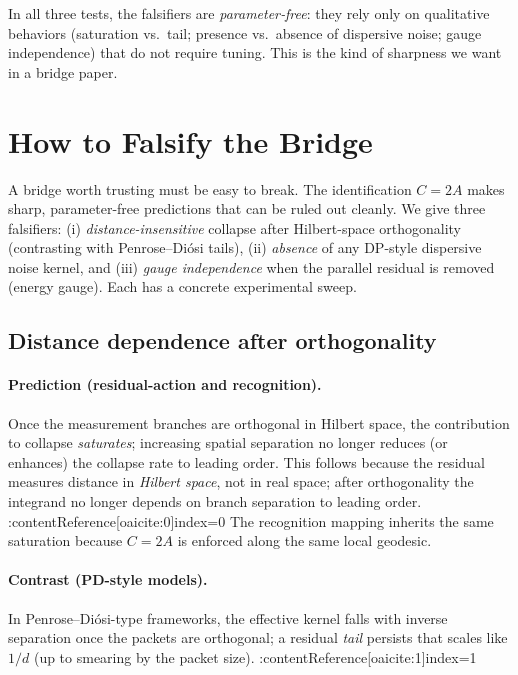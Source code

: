 \documentclass[11pt,letterpaper]{article}
\begin{document}
\medskip
In all three tests, the falsifiers are \emph{parameter‑free}: they rely only on qualitative behaviors (saturation vs.\ tail; presence vs.\ absence of dispersive noise; gauge independence) that do not require tuning. This is the kind of sharpness we want in a bridge paper. %

\section{How to Falsify the Bridge}

A bridge worth trusting must be easy to break. The identification $C=2A$ makes sharp, parameter-free predictions that can be ruled out cleanly. We give three falsifiers: (i) \emph{distance-insensitive} collapse after Hilbert-space orthogonality (contrasting with Penrose–Diósi tails), (ii) \emph{absence} of any DP-style dispersive noise kernel, and (iii) \emph{gauge independence} when the parallel residual is removed (energy gauge). Each has a concrete experimental sweep.

\subsection{Distance dependence after orthogonality}

\paragraph{Prediction (residual-action and recognition).}
Once the measurement branches are orthogonal in Hilbert space, the contribution to collapse \emph{saturates}; increasing spatial separation no longer reduces (or enhances) the collapse rate to leading order. This follows because the residual measures distance in \emph{Hilbert space}, not in real space; after orthogonality the integrand no longer depends on branch separation to leading order. :contentReference[oaicite:0]{index=0} The recognition mapping inherits the same saturation because $C=2A$ is enforced along the same local geodesic.

\paragraph{Contrast (PD-style models).}
In Penrose–Diósi-type frameworks, the effective kernel falls with inverse separation once the packets are orthogonal; a residual \emph{tail} persists that scales like $1/d$ (up to smearing by the packet size). :contentReference[oaicite:1]{index=1}
\end{document}
